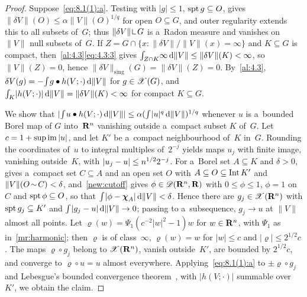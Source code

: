 \begin{proof}
    Suppose~\eqref{eq:8.1(1):a}. Testing with $|g| \le 1$, $\operatorname{spt} g \subseteq O$, gives $\|\delta
    V\|(O) \le \alpha \|V\|(O)^{1/q}$ for open $O \subseteq G$, and outer regularity extends this
    to all subsets of~$G$; thus $\|\delta V\| \restrict G$ is a~Radon measure and vanishes on
    $\|V\|$ null subsets of~$G$. If $Z = G \cap \{ x : \|\delta V\| / \|V\|(x) = \infty \}$ and $K
    \subseteq G$ is compact, then~\ref{al:4.3}\eqref{eq:4.3:3} gives ${\textstyle\int_{Z \cap K}^{}} \infty \,\mathrm{d}
    \|V\| \le \|\delta V\|(K) < \infty$, so $\|V\|(Z) = 0$, hence $\|\delta V\|_{\mathrm{sing}}(G) =
    \|\delta V\|(Z) = 0$. By~\ref{al:4.3}, $\delta V(g) = - {\textstyle\int_{}^{}} g \bullet h(V;\cdot) \,\mathrm{d}
    \|V\|$ for $g \in \mathscr{X}(G)$, and ${\textstyle\int_{K}^{}} |h(V;\cdot)| \,\mathrm{d} \|V\| = \|\delta V\|(K) <
    \infty$ for compact $K \subseteq G$.

    We show that $|{\textstyle\int_{}^{}} u \bullet h(V;\cdot) \,\mathrm{d} \|V\|| \le \alpha ({\textstyle\int_{}^{}} |u|^q \,\mathrm{d}
    \|V\|)^{1/q}$ whenever $u$ is a~bounded Borel map of $G$ into~$\mathbf{R}^{n}$ vanishing outside
    a~compact subset $K$ of~$G$. Let $c = 1 + \sup \operatorname{im} |u|$, and let $K'$ be a~compact
    neighbourhood of~$K$ in~$G$. Rounding the coordinates of~$u$ to integral multiples of~$2^{-j}$
    yields maps $u_j$ with finite image, vanishing outside~$K$, with $|u_j - u| \le n^{1/2}
    2^{-j}$. For a~Borel set $A \subseteq K$ and $\delta > 0$, \cite[2.2.5]{Federer1969} gives
    a~compact set $C \subseteq A$ and an open set $O$ with $A \subseteq O \subseteq \operatorname{Int} K'$ and
    $\|V\|(O \!\sim\! C) < \delta$, and~\ref{new:cutoff} gives $\phi \in \mathscr{D}(\mathbf{R}^{n},\mathbf{R})$
    with $0 \le \phi \le 1$, $\phi = 1$ on~$C$ and $\operatorname{spt} \phi \subseteq O$, so that ${\textstyle\int_{}^{}}
    |\phi - \boldsymbol{\chi}_{A}| \,\mathrm{d} \|V\| < \delta$. Hence there are $g_j \in \mathscr{X}(\mathbf{R}^{n})$ with $\operatorname{spt} g_j
    \subseteq K'$ and ${\textstyle\int_{}^{}} |g_j - u| \,\mathrm{d} \|V\| \to 0$; passing to a~subsequence, $g_j \to
    u$ at $\|V\|$ almost all points. Let $\varrho(w) = \Psi_1(c^{-2} |w|^2 - 1) w$ for $w \in
    \mathbf{R}^{n}$, with $\Psi_1$ as in~\ref{mr:harmonic}; then $\varrho$ is of class~$\infty$,
    $\varrho(w) = w$ for $|w| \le c$ and $|\varrho| \le 2^{1/2} c$. The maps $\varrho \circ g_j$
    belong to $\mathscr{X}(\mathbf{R}^{n})$, vanish outside~$K'$, are bounded by $2^{1/2} c$, and converge to
    $\varrho \circ u = u$ almost everywhere. Applying~\eqref{eq:8.1(1):a} to $\pm \varrho \circ g_j$
    and Lebesgue's bounded convergence theorem~\cite[2.4.9]{Federer1969}, with $|h(V;\cdot)|$
    summable over~$K'$, we obtain the claim.


\end{proof}
